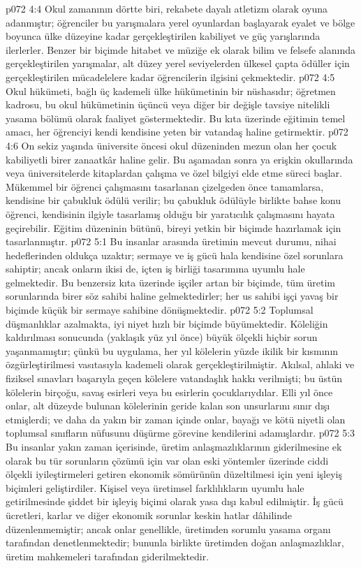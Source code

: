 \vs p072 4:4 Okul zamanının dörtte biri, rekabete dayalı atletizm olarak oyuna adanmıştır; öğrenciler bu yarışmalara yerel oyunlardan başlayarak eyalet ve bölge boyunca ülke düzeyine kadar gerçekleştirilen kabiliyet ve güç yarışlarında ilerlerler. Benzer bir biçimde hitabet ve müziğe ek olarak bilim ve felsefe alanında gerçekleştirilen yarışmalar, alt düzey yerel seviyelerden ülkesel çapta ödüller için gerçekleştirilen mücadelelere kadar öğrencilerin ilgisini çekmektedir.
\vs p072 4:5 Okul hükümeti, bağlı üç kademeli ülke hükümetinin bir nüshasıdır; öğretmen kadrosu, bu okul hükümetinin üçüncü veya diğer bir değişle tavsiye nitelikli yasama bölümü olarak faaliyet göstermektedir. Bu kıta üzerinde eğitimin temel amacı, her öğrenciyi kendi kendisine yeten bir vatandaş haline getirmektir.
\vs p072 4:6 On sekiz yaşında üniversite öncesi okul düzeninden mezun olan her çocuk kabiliyetli birer zanaatkâr haline gelir. Bu aşamadan sonra ya erişkin okullarında veya üniversitelerde kitaplardan çalışma ve özel bilgiyi elde etme süreci başlar. Mükemmel bir öğrenci çalışmasını tasarlanan çizelgeden önce tamamlarsa, kendisine bir çabukluk ödülü verilir; bu çabukluk ödülüyle birlikte bahse konu öğrenci, kendisinin ilgiyle tasarlamış olduğu bir yaratıcılık çalışmasını hayata geçirebilir. Eğitim düzeninin bütünü, bireyi yetkin bir biçimde hazırlamak için tasarlanmıştır.
\vs p072 5:1 Bu insanlar arasında üretimin mevcut durumu, nihai hedeflerinden oldukça uzaktır; sermaye ve iş gücü hala kendisine özel sorunlara sahiptir; ancak onların ikisi de, içten iş birliği tasarımına uyumlu hale gelmektedir. Bu benzersiz kıta üzerinde işçiler artan bir biçimde, tüm üretim sorunlarında birer söz sahibi haline gelmektedirler; her us sahibi işçi yavaş bir biçimde küçük bir sermaye sahibine dönüşmektedir.
\vs p072 5:2 Toplumsal düşmanlıklar azalmakta, iyi niyet hızlı bir biçimde büyümektedir. Köleliğin kaldırılması sonucunda (yaklaşık yüz yıl önce) büyük ölçekli hiçbir sorun yaşanmamıştır; çünkü bu uygulama, her yıl kölelerin yüzde ikilik bir kısmının özgürleştirilmesi vasıtasıyla kademeli olarak gerçekleştirilmiştir. Akılsal, ahlaki ve fiziksel sınavları başarıyla geçen kölelere vatandaşlık hakkı verilmişti; bu üstün kölelerin birçoğu, savaş esirleri veya bu esirlerin çocuklarıydılar. Elli yıl önce onlar, alt düzeyde bulunan kölelerinin geride kalan son unsurlarını sınır dışı etmişlerdi; ve daha da yakın bir zaman içinde onlar, bayağı ve kötü niyetli olan toplumsal sınıfların nüfusunu düşürme görevine kendilerini adamışlardır.
\vs p072 5:3 Bu insanlar yakın zaman içerisinde, üretim anlaşmazlıklarının giderilmesine ek olarak bu tür sorunların çözümü için var olan eski yöntemler üzerinde ciddi ölçekli iyileştirmeleri getiren ekonomik sömürünün düzeltilmesi için yeni işleyiş biçimleri geliştirdiler. Kişisel veya üretimsel farklılıkların uyumlu hale getirilmesinde şiddet bir işleyiş biçimi olarak yasa dışı kabul edilmiştir. İş gücü ücretleri, karlar ve diğer ekonomik sorunlar keskin hatlar dâhilinde düzenlenmemiştir; ancak onlar genellikle, üretimden sorumlu yasama organı tarafından denetlenmektedir; bununla birlikte üretimden doğan anlaşmazlıklar, üretim mahkemeleri tarafından giderilmektedir.

